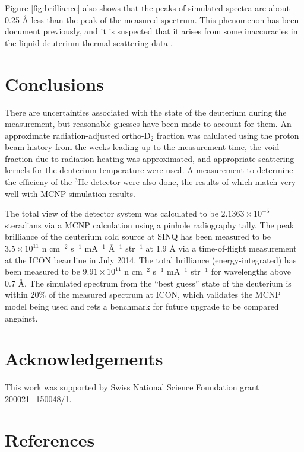 \documentclass[5p,12pt]{elsarticle}
\begin{document}
Figure \ref{fig:brilliance} also shows that the peaks of simulated spectra are about 0.25 {\AA} less than the peak of the measured spectrum.  This phenomenon has been document previously, and it is suspected that it arises from some inaccuracies in the liquid deuterium thermal scattering data \cite{giller_thesis}.

%
%
%
%
%

\section{Conclusions}
\label{sec:conclusions}

There are uncertainties associated with the state of the deuterium during the measurement, but reasonable guesses have been made to account for them.  An approximate radiation-adjusted ortho-D$_2$ fraction was calulated using the proton beam history from the weeks leading up to the measurement time, the void fraction due to radiation heating was approximated, and appropriate scattering kernels for the deuterium temperature were used.  A measurement to determine the efficieny of the $^3$He detector were also done, the results of which match very well with MCNP simulation results.

The total view of the detector system was calculated to be $2.1363\times10^{-5}$ steradians via a MCNP calculation using a pinhole radiography tally.  The peak brilliance of the deuterium cold source at SINQ has been measured to be $3.5\times10^{11}$ n cm$^{-2}$ s$^{-1}$ mA$^{-1}$ \AA$^{-1}$ str$^{-1}$ at 1.9 {\AA} via a time-of-flight measurement at the ICON beamline in July 2014.  The total brilliance (energy-integrated) has been measured to be  $9.91\times10^{11}$  n cm$^{-2}$ s$^{-1}$ mA$^{-1}$ str$^{-1}$ for wavelengths above 0.7 {\AA}.  The simulated spectrum from the ``best guess'' state of the deuterium is within 20\% of the measured spectrum at ICON, which validates the MCNP model being used and rets a benchmark for future upgrade to be compared angainst.

%
%
%
%
%

\section*{Acknowledgements}
\label{sec:ack}

This work was supported by Swiss National Science Foundation grant 200021\_150048/1.

%
%
%
%
%

\section*{References}


\end{document}
